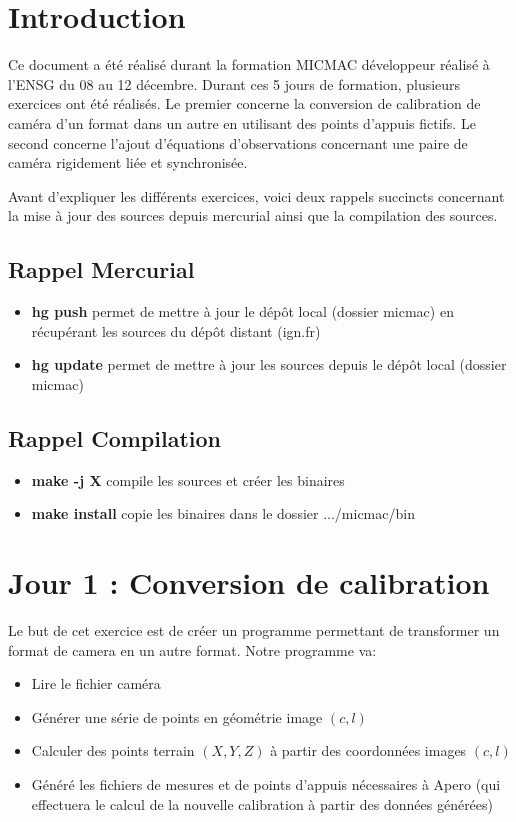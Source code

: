 \documentclass{article}
\newcommand\commande[1]{
\textbf{#1}
}
\begin{document}
\section{Introduction}
Ce document a été réalisé durant la formation MICMAC développeur réalisé à l'ENSG du 08 au 12 décembre.
Durant ces 5 jours de formation,  plusieurs exercices ont été réalisés.
Le premier concerne la conversion de calibration de caméra d'un format dans un autre en utilisant des points d'appuis fictifs.
Le second concerne l'ajout d'équations d'observations concernant une paire de caméra rigidement liée et synchronisée.

Avant d'expliquer les différents exercices, voici deux rappels succincts concernant la mise à jour des sources depuis mercurial ainsi que la compilation des sources.

\subsection{Rappel Mercurial}
\begin{itemize}
\item \commande{hg push} permet de mettre à jour le dépôt local (dossier micmac) en récupérant les sources du dépôt distant (ign.fr)
\item \commande{hg update} permet de mettre à jour les sources depuis le dépôt local  (dossier micmac)
\end{itemize}
\subsection{Rappel Compilation}
\begin{itemize}
\item \commande{make -j X} compile les sources et créer les binaires
\item \commande{make install} copie les binaires dans le dossier .../micmac/bin
\end{itemize}

\section{Jour 1 :  Conversion de calibration}
Le but de cet exercice est de créer un programme permettant de transformer un format de camera en un autre format.
Notre programme va:
\begin{itemize}
\item Lire le fichier caméra
\item Générer une série de points en géométrie image $(c,l)$
\item Calculer des points terrain $(X,Y,Z)$ à partir des coordonnées images $(c,l)$
\item Généré les fichiers de mesures et de points d'appuis nécessaires à Apero (qui effectuera le calcul de la nouvelle calibration à partir des données générées)
\end{itemize}
	
\end{document}
